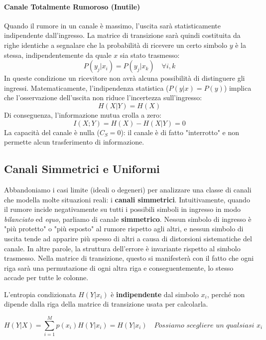 \paragraph{Canale Totalmente Rumoroso (Inutile)}
Quando il rumore in un canale è massimo, l'uscita sarà statisticamente indipendente dall'ingresso. La matrice di transizione sarà quindi costituita da righe identiche a segnalare che la probabilità di ricevere un certo simbolo $y$ è la stessa, indipendentemente da quale $x$ sia stato trasmesso:
\[ P(y_j|x_i) = P(y_j|x_k) \quad \forall i,k \]
In queste condizione un ricevitore non avrà alcuna possibilità di distinguere gli ingressi.
Matematicamente, l'indipendenza statistica ($P(y|x) = P(y)$) implica che l'osservazione dell'uscita non riduce l'incertezza sull'ingresso:
\[ H(X|Y) = H(X) \]
Di conseguenza, l'informazione mutua crolla a zero:
\[ I(X;Y) = H(X) - H(X|Y) = 0 \]
La capacità del canale è nulla ($C_S = 0$): il canale è di fatto "interrotto" e non permette alcun trasferimento di informazione.


\subsection{Canali Simmetrici e Uniformi}

Abbandoniamo i casi limite (ideali o degeneri) per analizzare una classe di canali che modella molte situazioni reali: i \textbf{canali simmetrici}.
Intuitivamente, quando il rumore incide negativamente su tutti i possibili simboli in ingresso in modo \textit{bilanciato} ed \textit{equo}, parliamo di canale \textbf{simmetrico}. 
Nessun simbolo di ingresso è "più protetto" o "più esposto" al rumore rispetto agli altri, e nessun simbolo di uscita tende ad apparire più spesso di altri a causa di distorsioni sistematiche del canale.
In altre parole, la struttura dell'errore è invariante rispetto al simbolo trasmesso.
 Nella matrice di transizione, questo si manifesterà con il fatto che ogni riga sarà una permutazione di ogni altra riga e conseguentemente, lo stesso accade per tutte le colonne.

%


L'entropia condizionata $H(Y|x_i)$ è \textbf{indipendente} dal simbolo $x_i$, perché non dipende dalla riga della matrice di transizione usata per calcolarla.

\[H(Y|X)= \sum_{i=1}^Mp(x_i)H(Y|x_i)= H(Y|x_i) \quad \textit{Possiamo scegliere un qualsiasi $x_i$} \]

